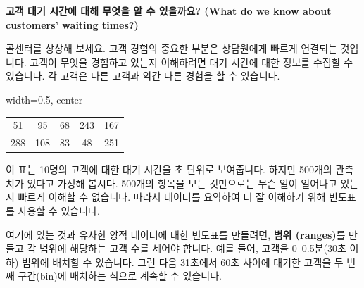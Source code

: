 \documentclass[11pt,a4paper]{article}
\theoremstyle{definition}
\begin{document}
\begin{tcolorbox}[title={양적 데이터에 대한 빈도표 (Frequency Table for Quantitative Data)}]
\textbf{고객 대기 시간에 대해 무엇을 알 수 있을까요? (What do we know about customers’ waiting times?)}

콜센터를 상상해 보세요. 고객 경험의 중요한 부분은 상담원에게 빠르게 연결되는 것입니다. 고객이 무엇을 경험하고 있는지 이해하려면 대기 시간에 대한 정보를 수집할 수 있습니다. 각 고객은 다른 고객과 약간 다른 경험을 할 수 있습니다.

\begin{center}
\label{tab:customer_waiting_time_raw}
\begin{adjustbox}{width=0.5\textwidth, center}
\begin{tabular}{ccccc}
\toprule
51 & 95 & 68 & 243 & 167 \\
288 & 108 & 83 & 48 & 251 \\
\bottomrule
\end{tabular}
\end{adjustbox}
\end{center}
이 표는 10명의 고객에 대한 대기 시간을 초 단위로 보여줍니다. 하지만 500개의 관측치가 있다고 가정해 봅시다. 500개의 항목을 보는 것만으로는 무슨 일이 일어나고 있는지 빠르게 이해할 수 없습니다. 따라서 데이터를 요약하여 더 잘 이해하기 위해 빈도표를 사용할 수 있습니다.

여기에 있는 것과 유사한 양적 데이터에 대한 빈도표를 만들려면, \textbf{범위 (ranges)}를 만들고 각 범위에 해당하는 고객 수를 세어야 합니다. 예를 들어, 고객을 0~0.5분(30초 이하) 범위에 배치할 수 있습니다. 그런 다음 31초에서 60초 사이에 대기한 고객을 두 번째 구간(bin)에 배치하는 식으로 계속할 수 있습니다.


\end{tcolorbox}
\end{document}
